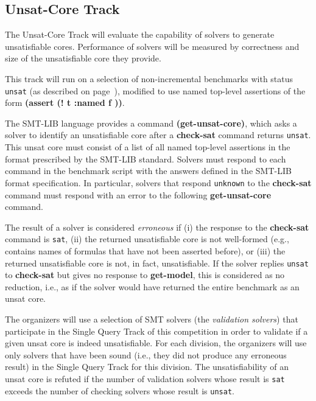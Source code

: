 \documentclass[12pt]{article}
\newcommand{\akey}[1]{\textbf{#1}\xspace}
\newcommand{\maintrack}{Single Query Track\xspace}
\newcommand{\ucoretrack}{Unsat-Core Track\xspace}
\begin{document}
\subsection{\ucoretrack}
\label{sec:exec:unsat-core}

The \ucoretrack will evaluate the capability of solvers to generate
unsatisfiable cores.  Performance of solvers will be measured by correctness
and size of the unsatisfiable core they provide.

This track will run on a selection of non-incremental benchmarks with status
\texttt{unsat} (as described on page~\pageref{benchmark-selection}), modified
to use named top-level assertions of the form \akey{(assert (! t :named f ))}.


The SMT-LIB language provides a command \akey{(get-unsat-core)}, which asks
a solver to identify an unsatisfiable core after a \akey{check-sat}
command returns \texttt{unsat}.
This unsat core must consist of a list of all named top-level
assertions in the format prescribed by the SMT-LIB standard.
%
Solvers must respond to each command in the benchmark script with the
answers defined in the SMT-LIB format specification.  In particular,
solvers that respond \texttt{unknown} to the \akey{check-sat} command
must respond with an error to the following \akey{get-unsat-core}
command.

The result of a solver is considered \emph{erroneous} if (i) the
response to the \akey{check-sat} command is \texttt{sat}, (ii) the
returned unsatisfiable core is not well-formed (e.g., contains names of
formulas that have not been asserted before), or (iii) the returned
unsatisfiable core is not, in fact, unsatisfiable.
%
If the solver replies \texttt{unsat} to \akey{check-sat} but gives no
response to \akey{get-model}, this is considered as no reduction, i.e.,
as if the solver would have returned the entire benchmark as an unsat
core.

The organizers will use a selection of SMT solvers (the \emph{validation
solvers}) that participate in the \maintrack of this competition in order to
validate if a given unsat core is indeed unsatisfiable.  For each division, the
organizers will use only solvers that have been sound (i.e., they did not
produce any erroneous result) in the \maintrack for this division.  The
unsatisfiability of an unsat core is refuted if the number of validation
solvers whose result is \texttt{sat} exceeds the number of checking solvers
whose result is \texttt{unsat}.
\end{document}
